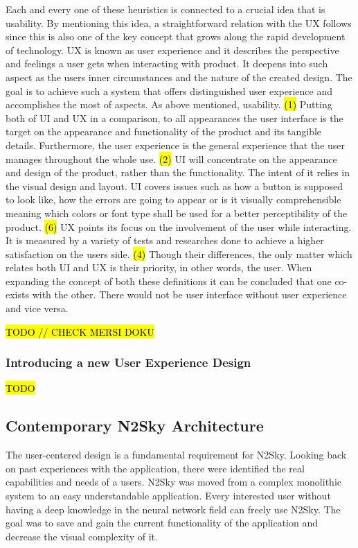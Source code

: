 Each and every one of these heuristics is connected to a crucial idea that is usability. By mentioning this idea, a straightforward relation with the UX follows since this is also one of the key concept that grows along the rapid development of technology. UX is known as user experience and it describes the perspective and feelings a user gets when interacting with product. It deepens into such aspect as the users inner circumstances and the nature of the created design. The goal is to achieve such a system that offers distinguished user experience and accomplishes the most of aspects. As above mentioned, usability.  \hl{(1)}
Putting both of UI and UX in a comparison, to all appearances the user interface is the target on the appearance and functionality of the product and its tangible details.  Furthermore, the user experience is the general experience that the user manages throughout the whole use.   \hl{(2)}
UI will concentrate on the appearance and design of the product, rather than the functionality. The intent of it relies in the visual design and layout. UI covers issues such as how a button is supposed to look like, how the errors are going to appear or is it visually comprehensible meaning which colors or font type shall be used for a better perceptibility of the product.  \hl{(6)}
UX points its focus on the involvement of the user while interacting. It is measured by a variety of tests and researches done to achieve a higher satisfaction on the users side.  \hl{(4)}
Though their differences, the only matter which relates both UI and UX is their priority, in other words, the user. When expanding the concept of both these definitions it can be concluded that one co-exists with the other. There would not be user interface without user experience and vice versa. 

 \hl{TODO // CHECK MERSI DOKU}

\subsubsection{Introducing a new User Experience Design}\label{Introducing a new User Experience Design}

 \hl{TODO}


\subsection{Contemporary N2Sky Architecture}\label{Contemporary N2Sky Architecture}

The user-centered design is a fundamental requirement for N2Sky. Looking back on past experiences with the application, there were identified the real capabilities and needs of a users. N2Sky was moved from a complex monolithic system to an easy understandable application. Every interested user without having a deep knowledge in the neural network field can freely use N2Sky.  The goal was to save and gain the current functionality of the application and decrease the visual complexity of it. 

